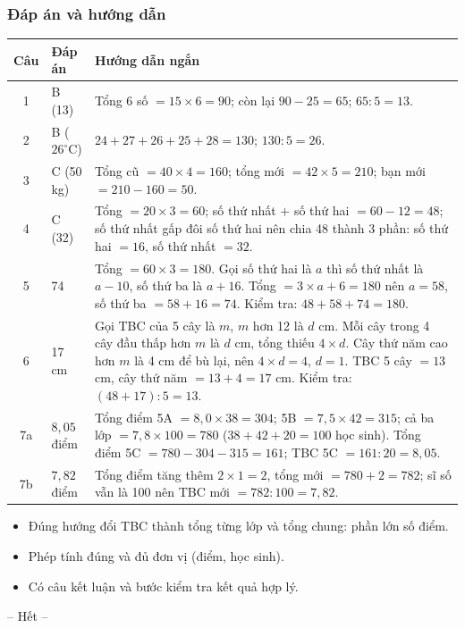 \documentclass[../main.tex]{subfiles}
\begin{document}
\subsubsection{Đáp án và hướng dẫn}
\begin{center}
\begin{tabular}{|c|S{2.6cm}|S{11cm}|}
    \hline
    \textbf{Câu} & \textbf{Đáp án} & \textbf{Hướng dẫn ngắn} \\
     & B (13) & Tổng 6 số $= 15 \times 6 = 90$; còn lại $90 - 25 = 65$; $65 : 5 = 13$. \\
     & B ($26^\circ$C) & $24 + 27 + 26 + 25 + 28 = 130$; $130 : 5 = 26$. \\
     & C (50 kg) & Tổng cũ $= 40 \times 4 = 160$; tổng mới $= 42 \times 5 = 210$; bạn mới $= 210 - 160 = 50$. \\
     & C (32) & Tổng $= 20 \times 3 = 60$; số thứ nhất $+$ số thứ hai $= 60 - 12 = 48$; số thứ nhất gấp đôi số thứ hai nên chia 48 thành 3 phần: số thứ hai $= 16$, số thứ nhất $= 32$. \\
     & 74 & Tổng $= 60 \times 3 = 180$. Gọi số thứ hai là $a$ thì số thứ nhất là $a - 10$, số thứ ba là $a + 16$. Tổng $= 3 \times a + 6 = 180$ nên $a = 58$, số thứ ba $= 58 + 16 = 74$. Kiểm tra: $48 + 58 + 74 = 180$. \\
     & 17 cm & Gọi TBC của 5 cây là $m$, $m$ hơn 12 là $d$ cm. Mỗi cây trong 4 cây đầu thấp hơn $m$ là $d$ cm, tổng thiếu $4 \times d$. Cây thứ năm cao hơn $m$ là 4 cm để bù lại, nên $4 \times d = 4$, $d = 1$. TBC 5 cây $= 13$ cm, cây thứ năm $= 13 + 4 = 17$ cm. Kiểm tra: $(48 + 17) : 5 = 13$. \\
    \hline
    7a & $8{,}05$ điểm & Tổng điểm 5A $= 8{,}0 \times 38 = 304$; 5B $= 7{,}5 \times 42 = 315$; cả ba lớp $= 7{,}8 \times 100 = 780$ ($38 + 42 + 20 = 100$ học sinh). Tổng điểm 5C $= 780 - 304 - 315 = 161$; TBC 5C $= 161 : 20 = 8{,}05$. \\
    \hline
    7b & $7{,}82$ điểm & Tổng điểm tăng thêm $2 \times 1 = 2$, tổng mới $= 780 + 2 = 782$; sĩ số vẫn là 100 nên TBC mới $= 782 : 100 = 7{,}82$. \\
    \hline
\end{tabular}
\end{center}

\begin{itemize}
    \item Đúng hướng đổi TBC thành tổng từng lớp và tổng chung: phần lớn số điểm.
    \item Phép tính đúng và đủ đơn vị (điểm, học sinh).
    \item Có câu kết luận và bước kiểm tra kết quả hợp lý.
\end{itemize}

\begin{center}
       -- Hết --
\end{center}
\end{document}
